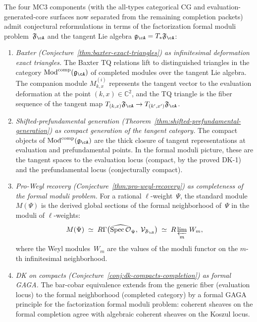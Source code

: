 \begin{conjecture}
\label{conj:mc3-formal-moduli-reformulation}
The four MC3 components (with the all-types categorical CG and
evaluation-generated-core surfaces now separated from the remaining
completion packets) admit conjectural reformulations in terms
of the factorization formal moduli problem~$\mathfrak{F}_{\cA}$
and the tangent Lie algebra
$\mathfrak{g}_{\cA} = T_{*}\mathfrak{F}_{\cA}$:
\begin{enumerate}[label=\textup{(\Roman*)}]
\item \emph{Baxter
 \textup{(}Conjecture~\textup{\ref{thm:baxter-exact-triangles}}\textup{)}
 as infinitesimal deformation exact triangles.}
 The Baxter TQ relations lift to distinguished triangles in
 the category $\operatorname{Mod}^{\mathrm{comp}}(\mathfrak{g}_{\cA})$
 of completed modules over the tangent Lie algebra. The
 companion module $M_{k,x}^{(i)}$ represents the tangent
 vector to the evaluation deformation at the point
 $(k, x) \in \mathbb{C}^2$, and the TQ triangle is the
 fiber sequence of the tangent map
 $T_{(k,x)}\mathfrak{F}_{\cA} \to
 T_{(k',x')}\mathfrak{F}_{\cA}$.

\item \emph{Shifted-prefundamental generation
 \textup{(}Theorem~\textup{\ref{thm:shifted-prefundamental-generation}}\textup{)}
 as compact generation of the tangent category.}
 The compact objects of
 $\operatorname{Mod}^{\mathrm{comp}}(\mathfrak{g}_{\cA})$
 are the thick closure of tangent representations at
 evaluation and prefundamental points. In the formal moduli
 picture, these are the tangent spaces to the evaluation
 locus (compact, by the proved DK-1) and the
 prefundamental locus (conjecturally compact).

\item \emph{Pro-Weyl recovery
 \textup{(}Conjecture~\textup{\ref{thm:pro-weyl-recovery}}\textup{)}
 as completeness of the formal moduli problem.}
 For a rational $\ell$-weight~$\Psi$, the standard module
 $M(\Psi)$ is the derived global sections of the formal
 neighborhood of~$\Psi$ in the moduli of $\ell$-weights:
 \[
 M(\Psi)
 \;\simeq\;
 R\Gamma\bigl(\widehat{\mathrm{Spec}\,
 \mathcal{O}}_\Psi,\;
 \mathcal{V}_{\mathfrak{F}_{\cA}}\bigr)
 \;\simeq\;
 R\varprojlim_m\, W_m,
 \]
 where the Weyl modules~$W_m$ are the values of the moduli
 functor on the $m$-th infinitesimal neighborhood.

\item \emph{DK on compacts
 \textup{(}Conjecture~\textup{\ref{conj:dk-compacts-completion}}\textup{)}
 as formal GAGA.}
 The bar-cobar equivalence extends from the generic
 fiber (evaluation locus) to the formal neighborhood
 (completed category) by a formal GAGA principle for
 the factorization formal moduli problem:
 coherent sheaves on the formal completion agree with
 algebraic coherent sheaves on the Koszul locus.
\end{enumerate}
\end{conjecture}

